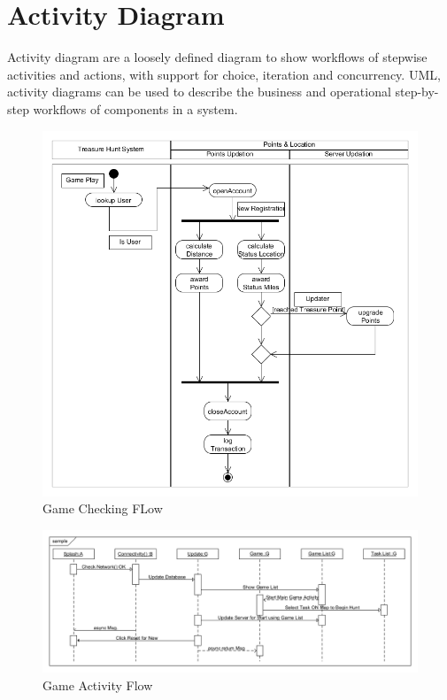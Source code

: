 \section{Activity Diagram}
Activity diagram are a loosely defined diagram to show workflows of stepwise activities and actions, with support for choice, iteration and concurrency. UML, activity diagrams can be used to describe the business and operational step-by-step workflows of components in a system. 

\begin{figure}[ht!]
\left
\includegraphics[width=150mm]{images/activityflow}
\caption{Game Checking FLow}
\label{overflow}
\end{figure}

\begin{figure}[ht!]
\left
\includegraphics[width=150mm]{reset}
\caption{Game Activity Flow}
\label{overflow}
\end{figure}



